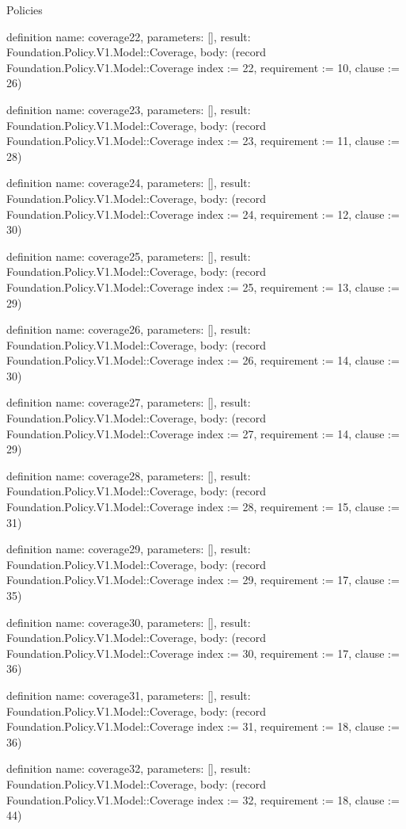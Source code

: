\begin{lexlean}{Policies}
\begin{semanticmodule}
definition{
  name: coverage22,
  parameters: [],
  result: Foundation.Policy.V1.Model::Coverage,
  body: (record Foundation.Policy.V1.Model::Coverage {index := 22, requirement := 10, clause := 26})
}

definition{
  name: coverage23,
  parameters: [],
  result: Foundation.Policy.V1.Model::Coverage,
  body: (record Foundation.Policy.V1.Model::Coverage {index := 23, requirement := 11, clause := 28})
}

definition{
  name: coverage24,
  parameters: [],
  result: Foundation.Policy.V1.Model::Coverage,
  body: (record Foundation.Policy.V1.Model::Coverage {index := 24, requirement := 12, clause := 30})
}

definition{
  name: coverage25,
  parameters: [],
  result: Foundation.Policy.V1.Model::Coverage,
  body: (record Foundation.Policy.V1.Model::Coverage {index := 25, requirement := 13, clause := 29})
}

definition{
  name: coverage26,
  parameters: [],
  result: Foundation.Policy.V1.Model::Coverage,
  body: (record Foundation.Policy.V1.Model::Coverage {index := 26, requirement := 14, clause := 30})
}

definition{
  name: coverage27,
  parameters: [],
  result: Foundation.Policy.V1.Model::Coverage,
  body: (record Foundation.Policy.V1.Model::Coverage {index := 27, requirement := 14, clause := 29})
}

definition{
  name: coverage28,
  parameters: [],
  result: Foundation.Policy.V1.Model::Coverage,
  body: (record Foundation.Policy.V1.Model::Coverage {index := 28, requirement := 15, clause := 31})
}

definition{
  name: coverage29,
  parameters: [],
  result: Foundation.Policy.V1.Model::Coverage,
  body: (record Foundation.Policy.V1.Model::Coverage {index := 29, requirement := 17, clause := 35})
}

definition{
  name: coverage30,
  parameters: [],
  result: Foundation.Policy.V1.Model::Coverage,
  body: (record Foundation.Policy.V1.Model::Coverage {index := 30, requirement := 17, clause := 36})
}

definition{
  name: coverage31,
  parameters: [],
  result: Foundation.Policy.V1.Model::Coverage,
  body: (record Foundation.Policy.V1.Model::Coverage {index := 31, requirement := 18, clause := 36})
}

definition{
  name: coverage32,
  parameters: [],
  result: Foundation.Policy.V1.Model::Coverage,
  body: (record Foundation.Policy.V1.Model::Coverage {index := 32, requirement := 18, clause := 44})
}


\end{semanticmodule}
\end{lexlean}
